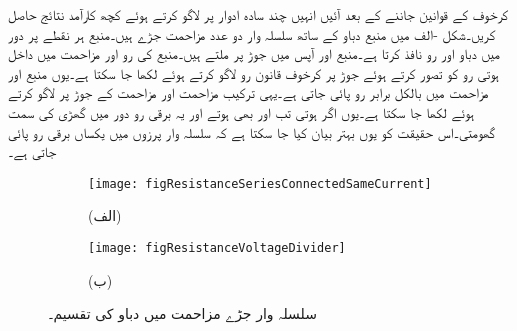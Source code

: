 کرخوف کے قوانین جاننے کے بعد آئیں انہیں چند سادہ ادوار پر لاگو کرتے ہوئے کچھ کارآمد نتائج حاصل کریں۔شکل -الف میں منبع دباو  کے ساتھ سلسلہ وار دو عدد مزاحمت جڑے ہیں۔منبع  ہر نقطے پر دور میں دباو اور رو نافذ کرتا ہے۔منبع اور  آپس میں جوڑ  پر ملتے ہیں۔منبع کی رو  اور مزاحمت میں داخل ہوتی رو کو  تصور کرتے ہوئے جوڑ  پر کرخوف قانون رو لاگو کرتے   ہوئے  لکھا جا سکتا ہے۔یوں منبع اور مزاحمت  میں بالکل برابر رو پائی جاتی ہے۔یہی ترکیب مزاحمت  اور مزاحمت  کے جوڑ  پر لاگو کرتے ہوئے  لکھا جا سکتا ہے۔یوں اگر  ہوتی تب  اور  بھی  ہوتے اور یہ برقی رو دور میں گھڑی کی سمت گھومتی۔اس حقیقت کو یوں بہتر بیان کیا جا سکتا ہے کہ سلسلہ وار پرزوں میں یکساں برقی رو پائی جاتی ہے۔
\begin{figure}
\centering
\begin{subfigure}{0.5\textwidth}
\centering
\texttt{[image: figResistanceSeriesConnectedSameCurrent]}
\caption*{(الف)}
\end{subfigure}%
\begin{subfigure}{0.5\textwidth}
\centering
\texttt{[image: figResistanceVoltageDivider]}
\caption*{(ب)}
\end{subfigure}%
\caption{سلسلہ وار جڑے مزاحمت میں دباو کی تقسیم۔}
\label{شکل_مزاحمتی_دباو_تقسیم}
\end{figure}

